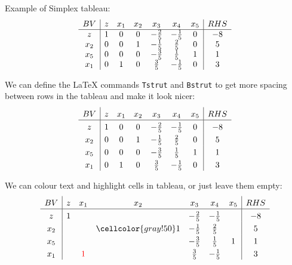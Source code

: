 \documentclass{article}
\newcommand\Tstrut{\rule{0pt}{2.6ex}}         %
\newcommand\Bstrut{\rule[-0.9ex]{0pt}{0pt}}   %
\begin{document}
Example of Simplex tableau:
\begin{align}
    \begin{array}{c | cccccc | c}
         BV  & z & x_1 & x_2 & x_3 & x_4 & x_5 & RHS \\ 
         \hline %
         z   & 1 & 0 & 0 & -\tfrac{2}{5} & -\tfrac{1}{5} & 0 & -8 \\
         x_2 & 0 & 0 & 1 & -\tfrac{1}{5} & \tfrac{2}{5}  & 0 & 5 \\
         x_5 & 0 & 0 & 0 & -\tfrac{3}{5} & \tfrac{1}{5}  & 1 & 1 \\
         x_1 & 0 & 1 & 0 & \tfrac{3}{5}  & -\tfrac{1}{5} & 0 & 3
    \end{array}
\end{align}


We can define the \LaTeX{} commands \texttt{Tstrut} and \texttt{Bstrut} to get more spacing between rows in the tableau and make it look nicer:
\begin{align}
    \begin{array}{c | cccccc | c}
         BV  & z & x_1 & x_2 & x_3 & x_4 & x_5 & RHS \Tstrut\Bstrut \\ 
         \hline
         z   & 1 & 0 & 0 & -\tfrac{2}{5} & -\tfrac{1}{5} & 0 & -8 \Tstrut\Bstrut \\
         x_2 & 0 & 0 & 1 & -\tfrac{1}{5} & \tfrac{2}{5}  & 0 & 5  \Tstrut\Bstrut \\
         x_5 & 0 & 0 & 0 & -\tfrac{3}{5} & \tfrac{1}{5}  & 1 & 1  \Tstrut\Bstrut \\
         x_1 & 0 & 1 & 0 & \tfrac{3}{5}  & -\tfrac{1}{5} & 0 & 3  \Tstrut\Bstrut
    \end{array}
\end{align}

We can colour text and highlight cells in tableau, or just leave them empty:
\begin{align}
    \begin{array}{c | cccccc | c}
         BV  & z & x_1 & x_2 & x_3 & x_4 & x_5 & RHS \Tstrut\Bstrut \\ 
         \hline
         z   & 1 & & & -\tfrac{2}{5} & -\tfrac{1}{5} & & -8 \Tstrut\Bstrut \\
         x_2 & & & \cellcolor{gray!50}1 & -\tfrac{1}{5} & \tfrac{2}{5} & & 5 \Tstrut\Bstrut \\
         x_5 & & & & -\tfrac{3}{5} & \tfrac{1}{5}  & 1 & 1 \Tstrut\Bstrut \\
         x_1 & & \textcolor{red}{1} & & \tfrac{3}{5}  & -\tfrac{1}{5} & & 3 \Tstrut\Bstrut
    \end{array}
\end{align}
\end{document}
